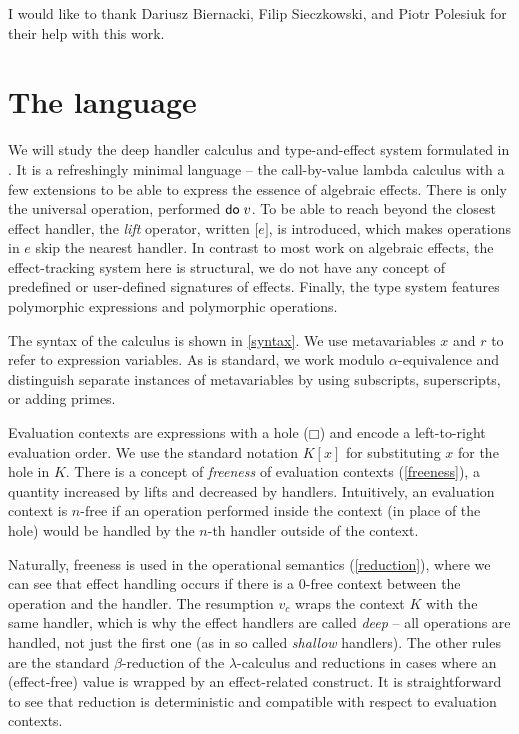 \documentclass[a4paper, 12pt]{report}
\newcommand{\keyword}[1]{\textsf{\textup{#1}}}
\newcommand{\Do}{\keyword{do}\;}
\newcommand{\Lift}[1]{\boldsymbol{[}#1\boldsymbol{]}}
\newcommand{\Free}{\textrm{-}\mathrm{free}}
\newcommand{\+}{\enspace}
\begin{document}
I would like to thank Dariusz Biernacki, Filip Sieczkowski, and Piotr Polesiuk
for their help with this work.

\chapter{The language}

We will study the deep handler calculus and type-and-effect system formulated
in \cite{fscd19}.
It is a refreshingly minimal language – the call-by-value lambda calculus with a few extensions
to be able to express the essence of algebraic effects.
There is only the universal operation, performed $\Do v$.
To be able to reach beyond the closest effect handler,
the \textit{lift} operator, written $\Lift{e}$, is introduced,
which makes operations in $e$ skip the nearest handler.
In contrast to most work on algebraic effects, the effect-tracking system here is structural,
we do not have any concept of predefined or user-defined signatures of effects.
Finally, the type system features polymorphic expressions and polymorphic operations.

The syntax of the calculus is shown in \cref{syntax}.
We use metavariables $x$ and $r$ to refer to expression variables.
As is standard, we work modulo $α$-equivalence and distinguish separate instances
of metavariables by using subscripts, superscripts, or adding primes.

Evaluation contexts are expressions with a hole ($□$) and
encode a left-to-right evaluation order.
We use the standard notation $K[x]$ for substituting $x$ for the hole in $K$.
There is a concept of {\em freeness} of evaluation contexts (\cref{freeness}),
a quantity increased by lifts and decreased by handlers.
Intuitively, an evaluation context is $n\Free$
if an operation performed inside the context (in place of the hole) %
would be handled by the $n$-th handler outside of the context.

Naturally, freeness is used in the operational semantics (\cref{reduction}),
where we can see that effect handling occurs if there
is a $0\Free$ context between the operation and the handler.
The resumption $v_c$ wraps the context $K$
with the same handler, which is why the effect handlers are called {\em deep}
– all operations are handled, not just the first one (as in so called {\em shallow} handlers).
The other rules are the standard $β$-reduction of the $λ$-calculus
and reductions in cases where an (effect-free) value is wrapped by an effect-related construct.
It is straightforward to see that reduction is deterministic
and compatible with respect to evaluation contexts.
\end{document}
